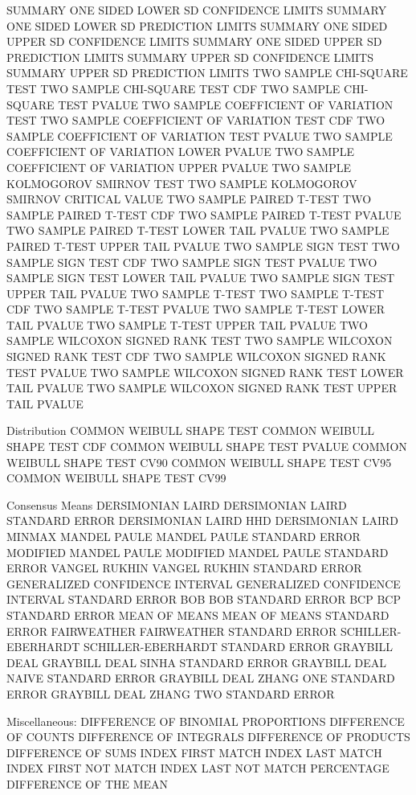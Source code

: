    SUMMARY ONE SIDED LOWER SD CONFIDENCE LIMITS
   SUMMARY ONE SIDED LOWER SD PREDICTION LIMITS
   SUMMARY ONE SIDED UPPER SD CONFIDENCE LIMITS
   SUMMARY ONE SIDED UPPER SD PREDICTION LIMITS
   SUMMARY UPPER SD CONFIDENCE LIMITS
   SUMMARY UPPER SD PREDICTION LIMITS
   TWO SAMPLE CHI-SQUARE TEST
   TWO SAMPLE CHI-SQUARE TEST CDF
   TWO SAMPLE CHI-SQUARE TEST PVALUE
   TWO SAMPLE COEFFICIENT OF VARIATION TEST
   TWO SAMPLE COEFFICIENT OF VARIATION TEST CDF
   TWO SAMPLE COEFFICIENT OF VARIATION TEST PVALUE
   TWO SAMPLE COEFFICIENT OF VARIATION LOWER PVALUE
   TWO SAMPLE COEFFICIENT OF VARIATION UPPER PVALUE
   TWO SAMPLE KOLMOGOROV SMIRNOV TEST
   TWO SAMPLE KOLMOGOROV SMIRNOV CRITICAL VALUE
   TWO SAMPLE PAIRED T-TEST
   TWO SAMPLE PAIRED T-TEST CDF
   TWO SAMPLE PAIRED T-TEST PVALUE
   TWO SAMPLE PAIRED T-TEST LOWER TAIL PVALUE
   TWO SAMPLE PAIRED T-TEST UPPER TAIL PVALUE
   TWO SAMPLE SIGN TEST
   TWO SAMPLE SIGN TEST CDF
   TWO SAMPLE SIGN TEST PVALUE
   TWO SAMPLE SIGN TEST LOWER TAIL PVALUE
   TWO SAMPLE SIGN TEST UPPER TAIL PVALUE
   TWO SAMPLE T-TEST
   TWO SAMPLE T-TEST CDF
   TWO SAMPLE T-TEST PVALUE
   TWO SAMPLE T-TEST LOWER TAIL PVALUE
   TWO SAMPLE T-TEST UPPER TAIL PVALUE
   TWO SAMPLE WILCOXON SIGNED RANK TEST
   TWO SAMPLE WILCOXON SIGNED RANK TEST CDF
   TWO SAMPLE WILCOXON SIGNED RANK TEST PVALUE
   TWO SAMPLE WILCOXON SIGNED RANK TEST LOWER TAIL PVALUE
   TWO SAMPLE WILCOXON SIGNED RANK TEST UPPER TAIL PVALUE

Distribution
   COMMON WEIBULL SHAPE TEST
   COMMON WEIBULL SHAPE TEST CDF
   COMMON WEIBULL SHAPE TEST PVALUE
   COMMON WEIBULL SHAPE TEST CV90
   COMMON WEIBULL SHAPE TEST CV95
   COMMON WEIBULL SHAPE TEST CV99

Consensus Means
   DERSIMONIAN LAIRD
   DERSIMONIAN LAIRD STANDARD ERROR
   DERSIMONIAN LAIRD HHD
   DERSIMONIAN LAIRD MINMAX
   MANDEL PAULE
   MANDEL PAULE STANDARD ERROR
   MODIFIED MANDEL PAULE
   MODIFIED MANDEL PAULE STANDARD ERROR
   VANGEL RUKHIN
   VANGEL RUKHIN STANDARD ERROR
   GENERALIZED CONFIDENCE INTERVAL
   GENERALIZED CONFIDENCE INTERVAL STANDARD ERROR
   BOB
   BOB STANDARD ERROR
   BCP
   BCP STANDARD ERROR
   MEAN OF MEANS
   MEAN OF MEANS STANDARD ERROR
   FAIRWEATHER
   FAIRWEATHER STANDARD ERROR
   SCHILLER-EBERHARDT
   SCHILLER-EBERHARDT STANDARD ERROR
   GRAYBILL DEAL
   GRAYBILL DEAL SINHA STANDARD ERROR
   GRAYBILL DEAL NAIVE STANDARD ERROR
   GRAYBILL DEAL ZHANG ONE STANDARD ERROR
   GRAYBILL DEAL ZHANG TWO STANDARD ERROR

Miscellaneous:
   DIFFERENCE OF BINOMIAL PROPORTIONS
   DIFFERENCE OF COUNTS
   DIFFERENCE OF INTEGRALS
   DIFFERENCE OF PRODUCTS
   DIFFERENCE OF SUMS
   INDEX FIRST MATCH
   INDEX LAST  MATCH
   INDEX FIRST NOT MATCH
   INDEX LAST  NOT MATCH
   PERCENTAGE DIFFERENCE OF THE MEAN

